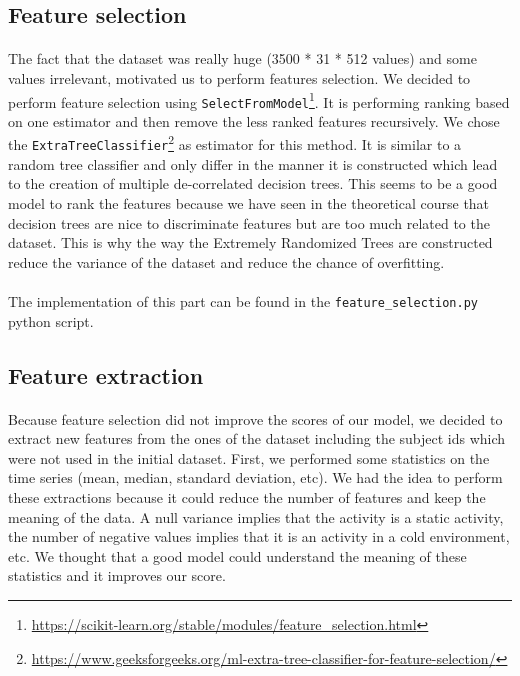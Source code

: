 \documentclass[a4paper, 11pt, oneside]{article}
\begin{document}
\subsection{Feature selection}
\paragraph{}The fact that the dataset was really huge (3500 * 31 * 512 values) and some values irrelevant, motivated us to perform features selection. We decided to perform feature selection using \texttt{SelectFromModel}\footnote{\url{https://scikit-learn.org/stable/modules/feature_selection.html}}. It is performing ranking based on one estimator and then remove the less ranked features recursively. We chose the \texttt{ExtraTreeClassifier}\footnote{\url{https://www.geeksforgeeks.org/ml-extra-tree-classifier-for-feature-selection/}} as estimator for this method. It is similar to a random tree classifier and only differ in the manner it is constructed which lead to the creation of multiple de-correlated decision trees. This seems to be a good model to rank the features because we have seen in the theoretical course that decision trees are nice to discriminate features but are too much related to the dataset. This is why the way the Extremely Randomized Trees are constructed reduce the variance of the dataset and reduce the chance of overfitting.

\paragraph{}The implementation of this part can be found in the \texttt{feature\_selection.py} python script. 

\subsection{Feature extraction} \label{sec:feature_ex}
\paragraph{}Because feature selection did not improve the scores of our model, we decided to extract new features from the ones of the dataset including the subject ids which were not used in the initial dataset. First, we performed some statistics on the time series (mean, median, standard deviation, etc). 
We had the idea to perform these extractions because it could reduce the number of features and keep the meaning of the data. A null variance implies that the activity is a static activity, the number of negative values implies that it is an activity in a cold environment, etc.
We thought that a good model could understand the meaning of these statistics and it improves our score. 
\end{document}
